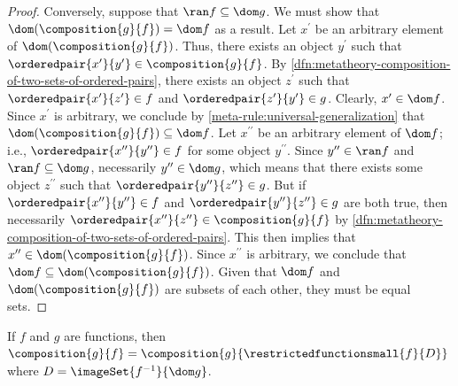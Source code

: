 \begin{proof}
    \vspace{0.3cm}
    \noindent
    Conversely, suppose that \( \ran f \subseteq \dom g \).
    We must show that \( \dom \mleft( \composition{g}{f} \mright) = \dom f \) as a result.
    Let \( x^{\prime} \) be an arbitrary element of \( \dom \mleft( \composition{g}{f} \mright) \).
    Thus, there exists an object \( y^{\prime} \) such that \( \orderedpair{x^{\prime}}{y^{\prime}} \in \composition{g}{f} \).
    By \cref{dfn:metatheory-composition-of-two-sets-of-ordered-pairs}, there exists an object \( z^{\prime} \)
    such that \( \orderedpair{x^{\prime}}{z^{\prime}} \in f \) and \( \orderedpair{z^{\prime}}{y^{\prime}} \in g \).
    Clearly, \( x^{\prime} \in \dom f \).
    Since \( x^{\prime} \) is arbitrary, we conclude by \cref{meta-rule:universal-generalization} that \( \dom \mleft( \composition{g}{f} \mright) \subseteq \dom f \).
    Let \( x^{\prime\prime} \) be an arbitrary element of \( \dom f \); i.e., \( \orderedpair{x^{\prime\prime}}{y^{\prime\prime}} \in f \) for some object
    \( y^{\prime\prime} \).
    Since \( y^{\prime\prime} \in \ran f \) and \( \ran f \subseteq \dom g \), necessarily \( y^{\prime\prime} \in \dom g \), which means that
    there exists some object \( z^{\prime\prime} \) such that \( \orderedpair{y^{\prime\prime}}{z^{\prime\prime}} \in g \).
    But if \( \orderedpair{x^{\prime\prime}}{y^{\prime\prime}} \in f \) and \( \orderedpair{y^{\prime\prime}}{z^{\prime\prime}} \in g \) are both true,
    then necessarily \( \orderedpair{x^{\prime\prime}}{z^{\prime\prime}} \in \composition{g}{f} \) by \cref{dfn:metatheory-composition-of-two-sets-of-ordered-pairs}.
    This then implies that \( x^{\prime\prime} \in \dom \mleft( \composition{g}{f} \mright) \).
    Since \( x^{\prime\prime} \) is arbitrary, we conclude that \( \dom f \subseteq \dom \mleft( \composition{g}{f} \mright) \).
    Given that \( \dom f \) and \( \dom \mleft( \composition{g}{f} \mright) \) are subsets of each other, they must be equal sets.
\end{proof}

\begin{thm}
     \label{thm:metatheory-g-compose-f-equals-g-compose-f-restricted-to-image-of-f-inverse}
    If \( f \) and \( g \) are functions, then \( \composition{g}{f} = \composition{g}{ \restrictedfunctionsmall{f}{D} } \)
    where \( D = \imageSet{f^{-1}}{\dom g} \).
\end{thm}

